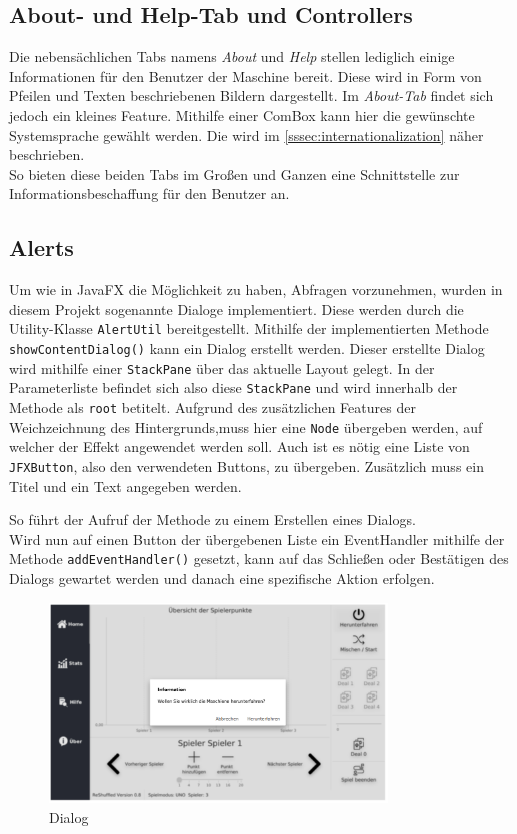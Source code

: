 \subsection{About- und Help-Tab und Controllers}
Die nebensächlichen Tabs namens \textit{About} und \textit{Help} stellen lediglich einige Informationen für den Benutzer der Maschine bereit.
Diese wird in Form von Pfeilen und Texten beschriebenen Bildern dargestellt.
Im \textit{About-Tab} findet sich jedoch ein kleines Feature.
Mithilfe einer ComBox kann hier die gewünschte Systemsprache gewählt werden.
Die  wird im \autoref{sssec:internationalization} näher beschrieben.\\
So bieten diese beiden Tabs im Großen und Ganzen eine Schnittstelle zur Informationsbeschaffung für den Benutzer an.
\subsection{Alerts}\label{sssec:alert}
Um wie in JavaFX die Möglichkeit zu haben, Abfragen vorzunehmen, wurden in diesem Projekt sogenannte Dialoge implementiert.
Diese werden durch die Utility-Klasse \lstinline[style=java]{AlertUtil} bereitgestellt.
Mithilfe der implementierten Methode \lstinline[style=java]{showContentDialog()} kann ein Dialog erstellt werden.
Dieser erstellte Dialog wird mithilfe einer \lstinline[style=java]{StackPane} über das aktuelle Layout gelegt.
In der Parameterliste befindet sich also diese \lstinline[style=java]{StackPane} und wird innerhalb der Methode als \lstinline[style=java]{root} betitelt.
Aufgrund des zusätzlichen Features der Weichzeichnung des Hintergrunds,muss hier eine \lstinline[style=java]{Node} übergeben werden, auf welcher der Effekt angewendet werden soll.
Auch ist es nötig eine Liste von \lstinline[style=java]{JFXButton}, also den verwendeten Buttons, zu übergeben.
Zusätzlich muss ein Titel und ein Text angegeben werden.

So führt der Aufruf der Methode zu einem Erstellen eines Dialogs.\\
Wird nun auf einen Button der übergebenen Liste ein EventHandler mithilfe der Methode \lstinline[style=java]{addEventHandler()} gesetzt,
kann auf das Schließen oder Bestätigen des Dialogs gewartet werden und danach eine spezifische Aktion erfolgen.
\begin{figure}[H]
\centering
\includegraphics[width=0.8\textwidth]{fig/ainf/Shutdown-Dialog.png}
\caption{Dialog}
\label{shutdown}
\end{figure}
